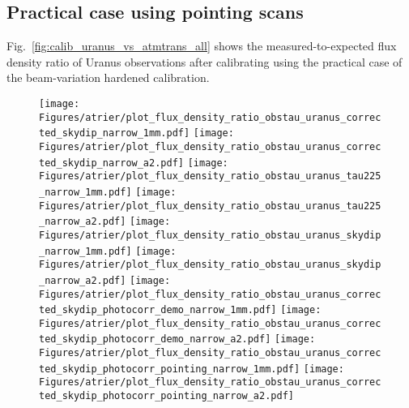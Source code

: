 \subsection{Practical case using pointing scans}
\label{se:photocorr_pointing}


Fig.~\ref{fig:calib_uranus_vs_atmtrans_all} shows the
measured-to-expected flux density ratio of Uranus observations after
calibrating using the practical case of the beam-variation
hardened calibration. 

\begin{figure}[ht!]
\begin{center}
    \texttt{[image: Figures/atrier/plot\_flux\_density\_ratio\_obstau\_uranus\_corrected\_skydip\_narrow\_1mm.pdf]}\hspace{0.2cm}
    \texttt{[image: Figures/atrier/plot\_flux\_density\_ratio\_obstau\_uranus\_corrected\_skydip\_narrow\_a2.pdf]}
    \vspace{0.3cm}
    \texttt{[image: Figures/atrier/plot\_flux\_density\_ratio\_obstau\_uranus\_tau225\_narrow\_1mm.pdf]}\hspace{0.2cm}
    \texttt{[image: Figures/atrier/plot\_flux\_density\_ratio\_obstau\_uranus\_tau225\_narrow\_a2.pdf]}
    \vspace{0.3cm}
    \texttt{[image: Figures/atrier/plot\_flux\_density\_ratio\_obstau\_uranus\_skydip\_narrow\_1mm.pdf]}\hspace{0.2cm}
    \texttt{[image: Figures/atrier/plot\_flux\_density\_ratio\_obstau\_uranus\_skydip\_narrow\_a2.pdf]}
    \vspace{0.3cm}
    \texttt{[image: Figures/atrier/plot\_flux\_density\_ratio\_obstau\_uranus\_corrected\_skydip\_photocorr\_demo\_narrow\_1mm.pdf]}\hspace{0.2cm}
    \texttt{[image: Figures/atrier/plot\_flux\_density\_ratio\_obstau\_uranus\_corrected\_skydip\_photocorr\_demo\_narrow\_a2.pdf]}
    \vspace{0.3cm}
    \texttt{[image: Figures/atrier/plot\_flux\_density\_ratio\_obstau\_uranus\_corrected\_skydip\_photocorr\_pointing\_narrow\_1mm.pdf]}\hspace{0.2cm}
    \texttt{[image: Figures/atrier/plot\_flux\_density\_ratio\_obstau\_uranus\_corrected\_skydip\_photocorr\_pointing\_narrow\_a2.pdf]}


\end{center}
\end{figure}
